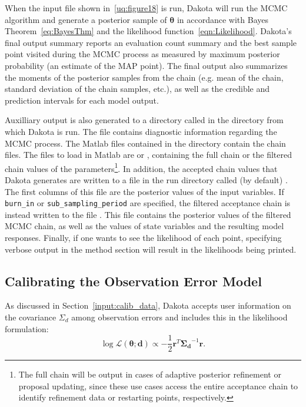 When the input file shown in~\ref{uq:figure18} is run, Dakota will run
the MCMC algorithm and generate a posterior sample of
$\boldsymbol{\theta}$ in accordance with Bayes
Theorem~\ref{eq:BayesThm} and the likelihood
function~\ref{eqn:Likelihood}. Dakota's final output summary reports
an evaluation count summary and the best sample point visited during
the MCMC process as measured by maximum posterior probability (an
estimate of the MAP point).  The final output also summarizes the
moments of the posterior samples from the chain (e.g.  mean of the
chain, standard deviation of the chain samples, etc.), as well as the
credible and prediction intervals for each model output.

Auxilliary output is also generated to a directory called
 in the directory from which Dakota is run.
The file  contains diagnostic information
regarding the MCMC process.  The Matlab files contained in the
 directory contain the chain files.  The
files to load in Matlab are  or
, containing the full chain or the filtered
chain values of the parameters\footnote{The full chain will be output
  in cases of adaptive posterior refinement or proposal updating,
  since these use cases access the entire acceptance chain to identify
  refinement data or restarting points, respectively.}.  In addition,
the accepted chain values that Dakota generates are written to a file
in the run directory called (by default)
. The first columns of this file are
the posterior values of the input variables. If \texttt{burn\_in} or
\texttt{sub\_sampling\_period} are specified, the filtered acceptance
chain is instead written to the file
. This file contains the posterior
values of the filtered MCMC chain, as well as the values of state
variables and the resulting model responses. Finally, if one wants to
see the likelihood of each point, specifying verbose output in the
method section will result in the likelihoods being printed.

\subsection{Calibrating the Observation Error Model}

As discussed in Section~\ref{input:calib_data}, Dakota accepts user
information on the covariance $\Sigma_d$ among observation errors and
includes this in the likelihood formulation:
\begin{equation*}
\log{\mathcal{L}(\boldsymbol{{\theta};d})} \propto %
-\frac{1}{2} \boldsymbol{r}^T \boldsymbol{\Sigma_d}^{-1} \boldsymbol{r}.
\end{equation*}

